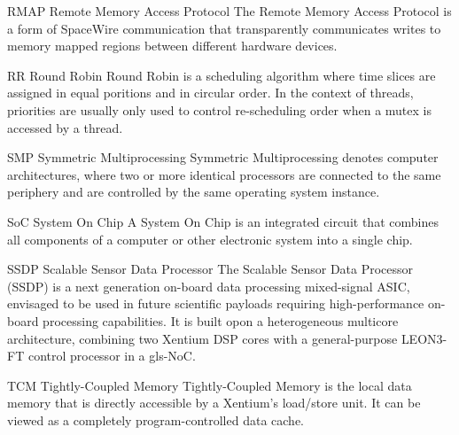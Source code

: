 %
  {RMAP}%
  {Remote Memory Access Protocol}%
  {The Remote Memory Access Protocol is a form of \gls{SpaceWire} communication
   that transparently communicates writes to memory mapped regions between
   different hardware devices.}%


%
  {RR}%
  {Round Robin}%
  {Round Robin is a scheduling algorithm where time slices are assigned in equal
   poritions and in circular order. In the context of threads, priorities are
   usually only used to control re-scheduling order when a mutex is accessed by
   a thread.}%


%
  {SMP}%
  {Symmetric Multiprocessing}%
  {Symmetric Multiprocessing denotes computer architectures, where two or more
   identical processors are connected to the same periphery and are controlled
   by the same operating system instance.}%

%
  {SoC}%
  {System On Chip}%
  {A System On Chip is an integrated circuit that combines all components of a %
   computer or other electronic system into a single chip.}%



  {SSDP}            %
  {Scalable Sensor Data Processor}  %
  {The Scalable Sensor Data Processor (SSDP) is a next generation on-board %
   data processing mixed-signal ASIC, envisaged to be used in future scientific %
   payloads requiring high-performance on-board processing capabilities. %
   It is built opon a heterogeneous multicore architecture, combining two %
   \gls{Xentium} \gls{DSP} cores with a general-purpose \gls{LEON3-FT} control %
   processor in a \gls{gls-NoC}.} %


%
  {TCM}%
  {Tightly-Coupled Memory}%
  {Tightly-Coupled Memory is the local data memory that is directly accessible %
   by a Xentium's load/store unit. It can be viewed as a completely %
   program-controlled data cache.}%


